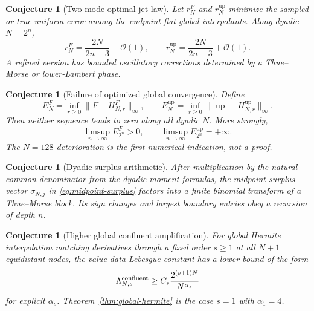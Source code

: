 \documentclass[11pt,oneside]{article}
\newtheorem{conjecture}[theorem]{Conjecture}
\theoremstyle{definition}
\theoremstyle{remark}
\newcommand{\Up}{\operatorname{up}}
\newcommand{\bigO}{\mathcal O}
\begin{document}
\begin{conjecture}[Two-mode optimal-jet law]
\label{conj:optimal-jet}
Let $r_N^F$ and $r_N^{\Up}$ minimize the sampled or true uniform error among the endpoint-flat
global interpolants.  Along dyadic $N=2^n$,
\begin{equation}
 r_N^F=\frac{2N}{2n-3}+\bigO(1),
 \qquad
 r_N^{\Up}=\frac{2N}{2n-3}+\bigO(1).
 \label{eq:conj-optimal-r}
\end{equation}
A refined version has bounded oscillatory corrections determined by a Thue--Morse or
lower-Lambert phase.
\end{conjecture}

\begin{conjecture}[Failure of optimized global convergence]
\label{conj:optimized-failure}
Define
\[
 E_N^F=\inf_{r\ge0}\|F-H^F_{N,r}\|_\infty,
 \qquad
 E_N^{\Up}=\inf_{r\ge0}\|\Up-H^{\Up}_{N,r}\|_\infty.
\]
Then neither sequence tends to zero along all dyadic $N$.  More strongly,
\begin{equation}
 \limsup_{n\to\infty}E_{2^n}^F>0,
 \qquad
 \limsup_{n\to\infty}E_{2^n}^{\Up}=+\infty.
 \label{eq:conj-nonconvergence}
\end{equation}
The $N=128$ deterioration is the first numerical indication, not a proof.
\end{conjecture}

\begin{conjecture}[Dyadic surplus arithmetic]
\label{conj:surplus}
After multiplication by the natural common denominator from the dyadic moment formulas, the
midpoint surplus vector $\sigma_{N,j}$ in \eqref{eq:midpoint-surplus} factors into a finite
binomial transform of a Thue--Morse block.  Its sign changes and largest boundary entries
obey a recursion of depth $n$.
\end{conjecture}

\begin{conjecture}[Higher global confluent amplification]
\label{conj:higher-hermite}
For global Hermite interpolation matching derivatives through a fixed order $s\ge1$ at all
$N+1$ equidistant nodes, the value-data Lebesgue constant has a lower bound of the form
\begin{equation}
 \Lambda_{N,s}^{\rm confluent}
 \ge C_s\frac{2^{(s+1)N}}{N^{\alpha_s}}
 \label{eq:conj-higher-hermite}
\end{equation}
for explicit $\alpha_s$.  Theorem~\ref{thm:global-hermite} is the case $s=1$ with
$\alpha_1=4$.
\end{conjecture}
\end{document}
